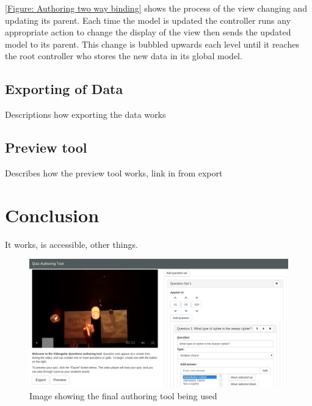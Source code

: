 \autoref{Figure: Authoring two way binding} shows the process of the view changing and updating its parent. Each time the model is updated the controller runs any appropriate action to change the display of the view then sends the updated model to its parent. This change is bubbled upwards each level until it reaches the root controller who stores the new data in its global model.

\subsection{Exporting of Data}

Descriptions how exporting the data works

\subsection{Preview tool}

Describes how the preview tool works, link in from export

\section{Conclusion}
\label{Section:Authoring_Conclusion}

It works, is accessible, other things.

\begin{figure}[h]
	\centering
		\includegraphics[width=\textwidth]{../figures/authoring_tool_example.png} 		
	\caption{\label{Figure:Authoring_Tool} Image showing the final authoring tool being used} 	
\end{figure}